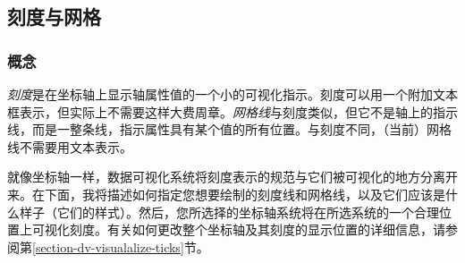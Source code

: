 \subsection{刻度与网格}
\label{section-dv-ticks-and-grids}

\subsubsection{概念}


\emph{刻度}是在坐标轴上显示轴属性值的一个小的可视化指示。刻度可以用一个附加文本框表示，但实际上不需要这样大费周章。\emph{网格线}与刻度类似，但它不是轴上的指示线，而是一整条线，指示属性具有某个值的所有位置。与刻度不同，（当前）网格线不需要用文本表示。


就像坐标轴一样，数据可视化系统将刻度表示的规范与它们被可视化的地方分离开来。在下面，我将描述如何指定您想要绘制的刻度线和网格线，以及它们应该是什么样子（它们的样式）。然后，您所选择的坐标轴系统将在所选系统的一个合理位置上可视化刻度。有关如何更改整个坐标轴及其刻度的显示位置的详细信息，请参阅第\ref{section-dv-visualalize-ticks}节。

